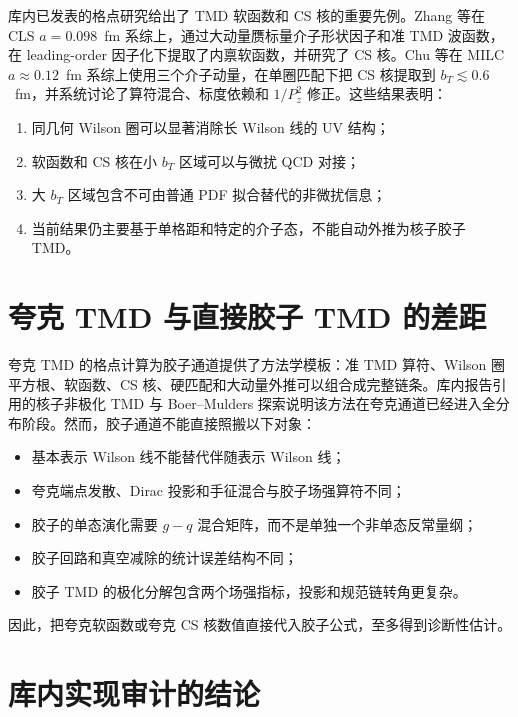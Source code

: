 \documentclass[UTF8,12pt,a4paper,twoside,openany]{ctexbook}
\begin{document}
库内已发表的格点研究给出了 TMD 软函数和 CS 核的重要先例。Zhang 等在 CLS \(a=0.098\)~fm 系综上，通过大动量赝标量介子形状因子和准 TMD 波函数，在 leading-order 因子化下提取了内禀软函数，并研究了 CS 核\cite{ZhangSoft2020}。Chu 等在 MILC \(a\approx0.12\)~fm 系综上使用三个介子动量，在单圈匹配下把 CS 核提取到 \(b_T\lesssim0.6\)~fm，并系统讨论了算符混合、标度依赖和 \(1/P_z^2\) 修正\cite{ChuCS2022}。这些结果表明：
\begin{enumerate}
  \item 同几何 Wilson 圈可以显著消除长 Wilson 线的 UV 结构；
  \item 软函数和 CS 核在小 \(b_T\) 区域可以与微扰 QCD 对接；
  \item 大 \(b_T\) 区域包含不可由普通 PDF 拟合替代的非微扰信息；
  \item 当前结果仍主要基于单格距和特定的介子态，不能自动外推为核子胶子 TMD。
\end{enumerate}

\section{夸克 TMD 与直接胶子 TMD 的差距}

夸克 TMD 的格点计算为胶子通道提供了方法学模板：准 TMD 算符、Wilson 圈平方根、软函数、CS 核、硬匹配和大动量外推可以组合成完整链条。库内报告引用的核子非极化 TMD 与 Boer--Mulders 探索说明该方法在夸克通道已经进入全分布阶段\cite{HeTMD2024,MaBM2025}。然而，胶子通道不能直接照搬以下对象：
\begin{itemize}
  \item 基本表示 Wilson 线不能替代伴随表示 Wilson 线；
  \item 夸克端点发散、Dirac 投影和手征混合与胶子场强算符不同；
  \item 胶子的单态演化需要 \(g-q\) 混合矩阵，而不是单独一个非单态反常量纲；
  \item 胶子回路和真空减除的统计误差结构不同；
  \item 胶子 TMD 的极化分解包含两个场强指标，投影和规范链转角更复杂。
\end{itemize}
因此，把夸克软函数或夸克 CS 核数值直接代入胶子公式，至多得到诊断性估计。

\section{库内实现审计的结论}
\end{document}
